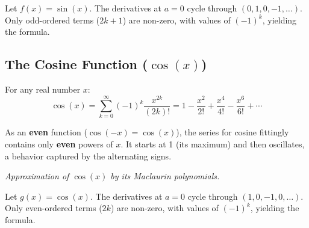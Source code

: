 \begin{proofbox}
Let $f(x) = \sin(x)$. The derivatives at $a=0$ cycle through $(0, 1, 0, -1, \dots)$. Only odd-ordered terms ($2k+1$) are non-zero, with values of $(-1)^k$, yielding the formula.
\end{proofbox}


\subsection{The Cosine Function ($\cos(x)$)}

\begin{theorembox}
For any real number $x$:
$$ \cos(x) = \sum_{k=0}^{\infty} (-1)^k \frac{x^{2k}}{(2k)!} = 1 - \frac{x^2}{2!} + \frac{x^4}{4!} - \frac{x^6}{6!} + \cdots $$
\end{theorembox}

\begin{intuitionbox}
As an \textbf{even} function ($ \cos(-x) = \cos(x) $), the series for cosine fittingly contains only \textbf{even} powers of $x$. It starts at 1 (its maximum) and then oscillates, a behavior captured by the alternating signs.

\tcblower

\centering
{}
\par\small\textit{Approximation of $\cos(x)$ by its Maclaurin polynomials.}
\end{intuitionbox}

\begin{proofbox}
Let $g(x) = \cos(x)$. The derivatives at $a=0$ cycle through $(1, 0, -1, 0, \dots)$. Only even-ordered terms ($2k$) are non-zero, with values of $(-1)^k$, yielding the formula.
\end{proofbox}


